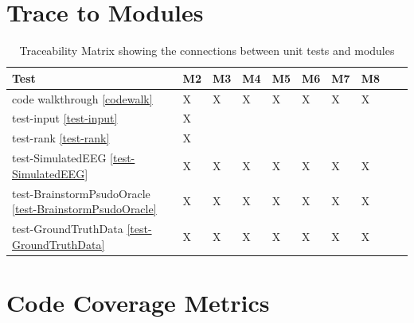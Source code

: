 \documentclass[12pt, titlepage]{article}
\begin{document}
\section{Trace to Modules}

\begin{table}[h]
    \begin{tabular}{|l|l|l|l|l|l|l|l|l|l|}
        \hline
         Test& M2 &M3 & M4 & M5 & M6 & M7 & M8 \\ \hline
       code walkthrough \ref{codewalk} & X &X  & X & X & X &X &X\\ \hline
       test-input \ref{test-input} & X &  &  &  &  & & \\ \hline
       test-rank \ref{test-rank} &  X & &  &  &  &  & \\ \hline
       test-SimulatedEEG  \ref{test-SimulatedEEG}  & X &X  & X & X & X &X &X \\\hline
       test-BrainstormPsudoOracle \ref{test-BrainstormPsudoOracle} & X &X  & X & X & X &X &X \\ \hline
       test-GroundTruthData \ref{test-GroundTruthData}  & X &X  & X & X & X &X &X \\ \hline
    \end{tabular}
\caption{Traceability Matrix showing the connections between unit tests and
    modules}
\label{Md_trace}
\end{table}		

\section{Code Coverage Metrics}





\end{document}
